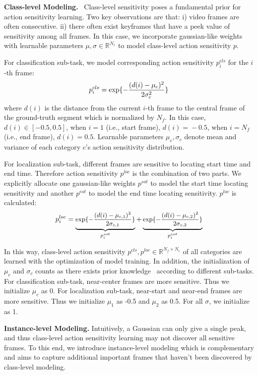 \documentclass[10pt,twocolumn,letterpaper]{article}
\begin{document}
\textbf{Class-level Modeling.}  
  \ Class-level sensitivity poses a fundamental prior for action sensitivity learning. 
  Two key observations are that: i) video frames are often consecutive. ii) there often exist keyframes that have a peek value of sensitivity among all frames. 
  In this case, we incorporate gaussian-like weights with learnable parameters $\mu,\sigma \in \mathbb{R}^{N_c}$ to model class-level action sensitivity $p$.
\par For classification sub-task, we model corresponding action sensitivity  $p_{i}^{cls}$ for the $i$-th frame:
\begin{equation} \small
      p^{cls}_i = \exp\{-\frac{(d(i)-\mu_{c})^2}{2\sigma_{c}^2}\}
\end{equation}
where $d(i)$ is the distance from the current $i$-th frame to the central frame of the ground-truth segment which is normalized by $N_f$. In this case, $d(i)\! \in \![-0.5, 0.5]$, when $i\!=\!1$ (i.e., start frame), $d(i)\!=\! -0.5$, when $i\!=\!N_f$ (i.e., end frame), $d(i)\!=\!0.5$.
Learnable parameters $\mu_{c},\sigma_{c}$ denote mean and variance of each category $c$'s action sensitivity distribution.
\par For localization sub-task, different frames are sensitive to locating start time and end time. Therefore action sensitivity $p^{loc}$ is the combination of two parts.
We explicitly allocate one gaussian-like weights $p^{sot}$ to model the start time locating sensitivity and another $p^{eot}$ to model the end time locating sensitivity. $ p^{loc} $ is calculated: 
\begin{equation} \small
      p^{loc}_i = \underbrace{\exp\{-\frac{(d(i)-\mu_{c,1})^2}{2\sigma_{c,1}}\}}_{p^{sot}_i} + \underbrace{\exp\{-\frac{(d(i)-\mu_{c,2})^2}{2\sigma_{c,2}}\}}_{p^{eot}_i}
\end{equation}
\par In this way, class-level action sensitivity $p^{cls},p^{loc} \!\in \!\mathbb{R}^{N_f \times N_c}$ of all categories are learned with the optimization of model training.
In addition, the initialization of $\mu_c$ and $\sigma_c$ counts as there exists prior knowledge~\cite{zhang2022actionformer,tian2019fcos} according to different sub-tasks. For classification sub-task, near-center frames are more sensitive. Thus we initialize $\mu_c$ as 0. For localization sub-task, near-start and near-end frames are more sensitive. Thus we initialize $\mu_1$ as -0.5 and $\mu_2$ as 0.5.
For all $\sigma$, we initialize as 1.

 
\textbf{Instance-level Modeling.} 
Intuitively, a Gaussian can only give a single peak, and thus class-level action sensitivity learning may not discover all sensitive frames. To this end, we introduce instance-level modeling which is complementary and aims to capture additional important frames that haven’t been discovered by class-level modeling. 
\end{document}
